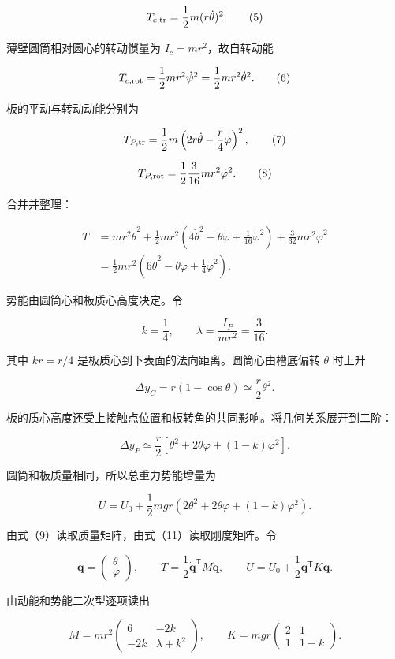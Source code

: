 \documentclass[12pt,a4paper,UTF8]{ctexart}
\begin{document}
\[
T_{c,\rm tr}=\frac12m(r\dot\theta)^2.
\tag{5}
\]

薄壁圆筒相对圆心的转动惯量为 \(I_c=mr^2\)，故自转动能

\[
T_{c,\rm rot}=\frac12mr^2\dot\psi^2
=\frac12mr^2\dot\theta^2.
\tag{6}
\]

板的平动与转动动能分别为

\[
T_{P,\rm tr}
=\frac12m\left(2r\dot\theta-\frac r4\dot\varphi\right)^2,
\tag{7}
\]

\[
T_{P,\rm rot}
=\frac12\frac{3}{16}mr^2\dot\varphi^2.
\tag{8}
\]

合并并整理：

\[
\begin{aligned}
T
&=mr^2\dot\theta^2
+\frac12mr^2
\left(4\dot\theta^2-\dot\theta\dot\varphi
+\frac1{16}\dot\varphi^2\right)
+\frac{3}{32}mr^2\dot\varphi^2\\
&=\frac12mr^2
\left(6\dot\theta^2-\dot\theta\dot\varphi
+\frac14\dot\varphi^2\right).
\end{aligned}
\tag{9}
\]

势能由圆筒心和板质心高度决定。令

\[
k=\frac14,
\qquad
\lambda=\frac{I_P}{mr^2}=\frac3{16}.
\tag{10}
\]

其中 \(kr=r/4\) 是板质心到下表面的法向距离。圆筒心由槽底偏转 \(\theta\)
时上升

\[
\Delta y_C=r(1-\cos\theta)
\simeq\frac r2\theta^2.
\]

板的质心高度还受上接触点位置和板转角的共同影响。将几何关系展开到二阶：

\[
\Delta y_P
\simeq\frac r2
\left[\theta^2+2\theta\varphi+(1-k)\varphi^2\right].
\]

圆筒和板质量相同，所以总重力势能增量为

\[
U=U_0+\frac12mgr
\left(2\theta^2+2\theta\varphi+(1-k)\varphi^2\right).
\tag{11}
\]

由式（9）读取质量矩阵，由式（11）读取刚度矩阵。令

\[
\boldsymbol q=
\begin{pmatrix}\theta\\ \varphi\end{pmatrix},
\qquad
T=\frac12\dot{\boldsymbol q}^{\mathsf T}M\dot{\boldsymbol q},
\qquad
U=U_0+\frac12\boldsymbol q^{\mathsf T}K\boldsymbol q.
\tag{12}
\]

由动能和势能二次型逐项读出

\[
M=mr^2
\begin{pmatrix}
6&-2k\\
-2k&\lambda+k^2
\end{pmatrix},
\qquad
K=mgr
\begin{pmatrix}
2&1\\
1&1-k
\end{pmatrix}.
\]
\end{document}
